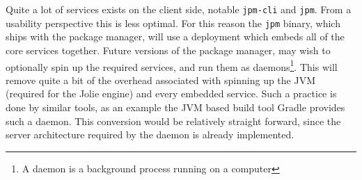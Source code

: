 Quite a lot of services exists on the client side, notable
\texttt{jpm-cli} and \texttt{jpm}. From a usability
perspective this is less optimal. For this reason the \texttt{jpm}
binary, which ships with the package manager, will use a deployment which
embeds all of the core services together. Future versions of the package
manager, may wish to optionally spin up the required services, and run them as
daemons\footnote{A daemon is a background process running on a computer}. This
will remove quite a bit of the overhead associated with spinning up the JVM
(required for the Jolie engine) and every embedded service. Such a practice is
done by similar tools, as an example the JVM based build tool Gradle provides
such a daemon\autocite{GRAA}.  This conversion would be relatively straight
forward, since the server architecture required by the daemon is already
implemented.

